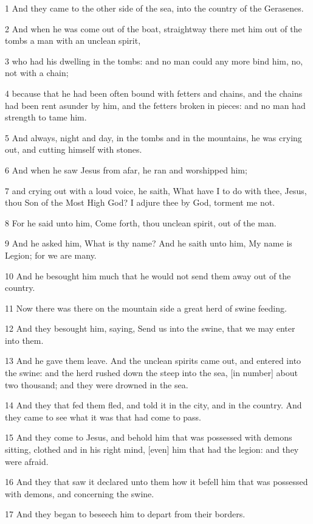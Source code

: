 \par 1 And they came to the other side of the sea, into the country of the Gerasenes.
\par 2 And when he was come out of the boat, straightway there met him out of the tombs a man with an unclean spirit,
\par 3 who had his dwelling in the tombs: and no man could any more bind him, no, not with a chain;
\par 4 because that he had been often bound with fetters and chains, and the chains had been rent asunder by him, and the fetters broken in pieces: and no man had strength to tame him.
\par 5 And always, night and day, in the tombs and in the mountains, he was crying out, and cutting himself with stones.
\par 6 And when he saw Jesus from afar, he ran and worshipped him;
\par 7 and crying out with a loud voice, he saith, What have I to do with thee, Jesus, thou Son of the Most High God? I adjure thee by God, torment me not.
\par 8 For he said unto him, Come forth, thou unclean spirit, out of the man.
\par 9 And he asked him, What is thy name? And he saith unto him, My name is Legion; for we are many.
\par 10 And he besought him much that he would not send them away out of the country.
\par 11 Now there was there on the mountain side a great herd of swine feeding.
\par 12 And they besought him, saying, Send us into the swine, that we may enter into them.
\par 13 And he gave them leave. And the unclean spirits came out, and entered into the swine: and the herd rushed down the steep into the sea, [in number] about two thousand; and they were drowned in the sea.
\par 14 And they that fed them fled, and told it in the city, and in the country. And they came to see what it was that had come to pass.
\par 15 And they come to Jesus, and behold him that was possessed with demons sitting, clothed and in his right mind, [even] him that had the legion: and they were afraid.
\par 16 And they that saw it declared unto them how it befell him that was possessed with demons, and concerning the swine.
\par 17 And they began to beseech him to depart from their borders.

